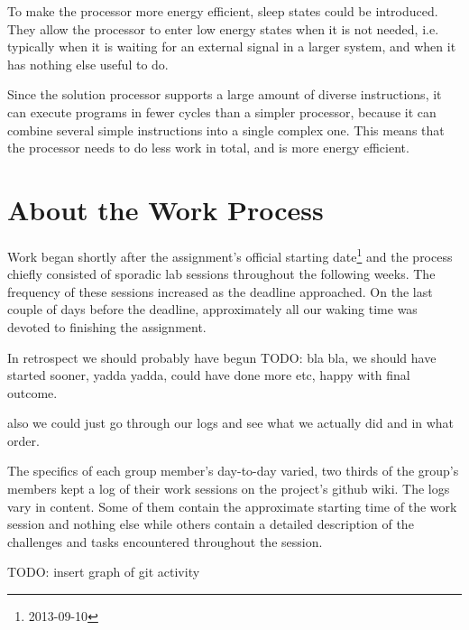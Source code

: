 To make the processor more energy efficient, sleep states could be introduced.
They allow the processor to enter low energy states when it is not needed, i.e. typically when it is waiting for an external signal in a larger system, and when it has nothing else useful to do.

Since the solution processor supports a large amount of diverse instructions, it can execute programs in fewer cycles than a simpler processor, because it can combine several simple instructions into a single complex one.
This means that the processor needs to do less work in total, and is more energy efficient.

\section{About the Work Process}

Work began shortly after the assignment's official starting date\footnote{2013-09-10} and the process chiefly consisted of sporadic lab sessions throughout the following weeks.
The frequency of these sessions increased as the deadline approached.
On the last couple of days before the deadline, approximately all our waking time was devoted to finishing the assignment.

In retrospect we should probably have begun 
TODO: bla bla, we should have started sooner, yadda yadda, could have done more etc, happy with final outcome.

also we could just go through our logs and see what we actually did and in what order.

The specifics of each group member's day-to-day varied, two thirds of the group's members kept a log of their work sessions on the project's github wiki. 
The logs vary in content. Some of them contain the approximate starting time of the work session and nothing else while others contain a detailed description of the challenges and tasks encountered throughout the session.

TODO: insert graph of git activity


